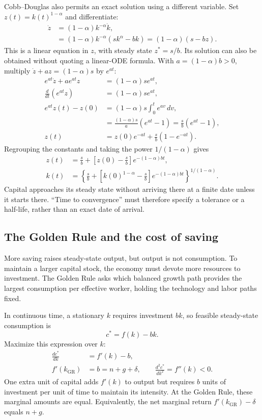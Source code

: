 Cobb--Douglas also permits an exact solution using a different variable. Set
$z(t)=k(t)^{1-\alpha}$ and differentiate:
\begin{align}
\dot z
&=(1-\alpha)k^{-\alpha}\dot k,\\
&=(1-\alpha)k^{-\alpha}(sk^\alpha-bk)
 =(1-\alpha)(s-bz).
\end{align}
This is a linear equation in $z$, with steady state $z^*=s/b$. Its solution
can also be obtained without quoting a linear-ODE formula. With
$a=(1-\alpha)b>0$, multiply $\dot z+az=(1-\alpha)s$ by $e^{at}$:
\begin{align}
e^{at}\dot z+ae^{at}z&=(1-\alpha)se^{at},\\
\frac{d}{dt}(e^{at}z)&=(1-\alpha)se^{at},\\
e^{at}z(t)-z(0)&=(1-\alpha)s\int_0^t e^{av}\,dv,\\
 &=\frac{(1-\alpha)s}{a}(e^{at}-1)
  =\frac{s}{b}(e^{at}-1),\\
z(t)&=z(0)e^{-at}+\frac{s}{b}(1-e^{-at}).
\end{align}
Regrouping the constants and taking the power $1/(1-\alpha)$ gives
\begin{align}
z(t)&=\frac{s}{b}+\left[z(0)-\frac{s}{b}\right]
 e^{-(1-\alpha)bt},\\
k(t)&=\left\{\frac{s}{b}+\left[k(0)^{1-\alpha}-\frac{s}{b}\right]
 e^{-(1-\alpha)bt}\right\}^{1/(1-\alpha)}.\label{eq:solow-exact-path}
\end{align}
Capital approaches its steady state without arriving there at a finite date
unless it starts there. ``Time to convergence'' must therefore specify a
tolerance or a half-life, rather than an exact date of arrival.

\subsection{The Golden Rule and the cost of saving}\label{golden-rate}

More saving raises steady-state output, but output is not consumption. To
maintain a larger capital stock, the economy must devote more resources to
investment. The Golden Rule asks which balanced growth path provides the
largest consumption per effective worker, holding the technology and labor
paths fixed.

In continuous time, a stationary $k$ requires investment $bk$, so feasible
steady-state consumption is
\begin{equation}\label{eq:solow-gr-consumption}
c^*=f(k)-bk.
\end{equation}
Maximize this expression over $k$:
\begin{align}
\frac{dc^*}{dk}&=f'(k)-b,\\
f'(k_{\mathrm{GR}})&=b=n+g+\delta,\qquad
\frac{d^2c^*}{dk^2}=f''(k)<0.\label{eq:solow-gr}
\end{align}
One extra unit of capital adds $f'(k)$ to output but requires $b$ units of
investment per unit of time to maintain its intensity. At the Golden Rule,
these marginal amounts are equal. Equivalently, the net marginal return
$f'(k_{\mathrm{GR}})-\delta$ equals $n+g$.

